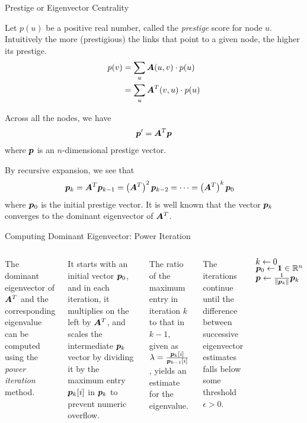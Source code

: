 \begin{frame}{Prestige or Eigenvector Centrality}


Let $p(u)$ be a positive real number, called the {\em prestige}
score for node $u$. 
Intuitively the more (prestigious) the links that
point to a given node, the higher its prestige. 
\begin{align*}
  p(v) & = \sum_u {\boldsymbol A}(u,v) \cdot p(u) \\
  & = \sum_u {\boldsymbol A}^T(v,u) \cdot p(u)
\end{align*}

Across all the nodes, we have
\begin{align*}
{\boldsymbol p}' = {\boldsymbol A}^T {\boldsymbol p}
\end{align*}
where ${\boldsymbol p}$ is an $n$-dimensional prestige vector.

By recursive expansion, we see that
\begin{align*}
  {\boldsymbol p}_k & = {\boldsymbol A}^T {\boldsymbol p}_{k-1} = \left({\boldsymbol A}^T\right)^2 {\boldsymbol p}_{k-2}
	= \cdots = \left({\boldsymbol A}^T\right)^k {\boldsymbol p}_{0}
\end{align*}
where ${\boldsymbol p}_0$ is the initial prestige vector.
It is well known that the vector ${\boldsymbol p}_k$ converges to the
dominant eigenvector of ${\boldsymbol A}^T$.
\end{frame}
%

\begin{frame}{Computing Dominant Eigenvector: Power Iteration}
\begin{columns}
\small
The dominant eigenvector of ${\boldsymbol A}^T$ and the corresponding eigenvalue can
be computed using the {\em power iteration} method.

\smallskip
It
starts with an initial vector ${\boldsymbol p}_0$, and
in each iteration, it multiplies on the
left by ${\boldsymbol A}^T$, and scales the intermediate ${\boldsymbol p}_k$ vector by dividing
it by the maximum entry ${\boldsymbol p}_k[i]$ in ${\boldsymbol p}_k$ to prevent numeric
overflow. 

\smallskip
The ratio of the maximum entry in iteration $k$ to that in
$k-1$, given as $\lambda = \tfrac{{\boldsymbol p}_k[i]}{{\boldsymbol p}_{k-1}[i]}$, yields an
estimate for the eigenvalue. 

\smallskip
The iterations continue until the
difference between successive eigenvector estimates falls below some
threshold $\epsilon > 0$.

\newcommand{\PowerMethod}{\textsc{PowerIteration}}
\SetKwInOut{Algorithm}{\PowerMethod\ ($\bA, \epsilon$)}
\Algorithm{}
$k \leftarrow 0$ \;
${\boldsymbol p}_0 \leftarrow \mathbf{1} \in {\mathord{\mathbb R}}^n$\;
${\boldsymbol p} \leftarrow \frac{1}{\left\lVert{\boldsymbol p}_k\right\rVert} {\boldsymbol p}_k$ \;
\Return{$\bp, \lambda$}
\end{columns}
\end{frame}


